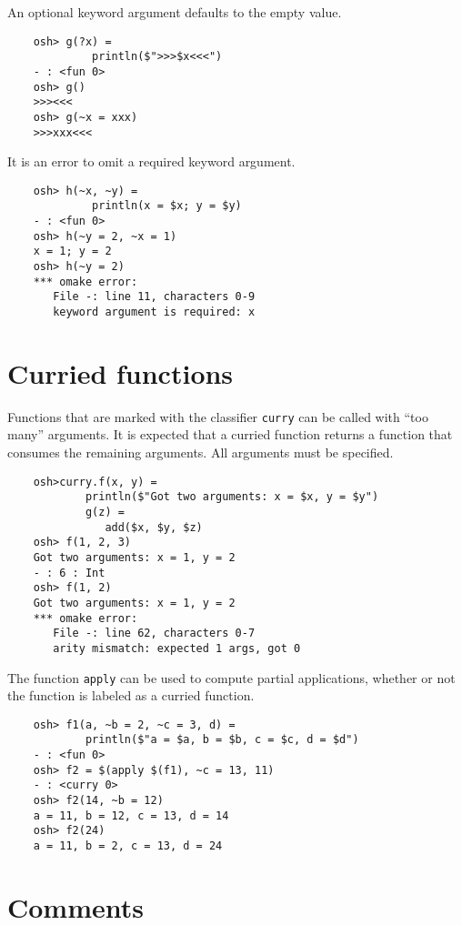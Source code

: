 An optional keyword argument defaults to the empty value.

\begin{verbatim}
    osh> g(?x) =
             println($">>>$x<<<")
    - : <fun 0>
    osh> g()
    >>><<<
    osh> g(~x = xxx)
    >>>xxx<<<
\end{verbatim}

It is an error to omit a required keyword argument.

\begin{verbatim}
    osh> h(~x, ~y) =
             println(x = $x; y = $y)
    - : <fun 0>
    osh> h(~y = 2, ~x = 1)
    x = 1; y = 2
    osh> h(~y = 2)
    *** omake error:
       File -: line 11, characters 0-9
       keyword argument is required: x
\end{verbatim}

\section{Curried functions}

Functions that are marked with the classifier \verb+curry+ can be called with ``too many'' arguments.
It is expected that a curried function returns a function that consumes the remaining arguments.
All arguments must be specified.

\begin{verbatim}
    osh>curry.f(x, y) =
            println($"Got two arguments: x = $x, y = $y")
            g(z) =
               add($x, $y, $z)
    osh> f(1, 2, 3)
    Got two arguments: x = 1, y = 2
    - : 6 : Int
    osh> f(1, 2)
    Got two arguments: x = 1, y = 2
    *** omake error:
       File -: line 62, characters 0-7
       arity mismatch: expected 1 args, got 0
\end{verbatim}

The function \verb+apply+ can be used to compute partial applications, whether or not the function
is labeled as a curried function.

\begin{verbatim}
    osh> f1(a, ~b = 2, ~c = 3, d) =
            println($"a = $a, b = $b, c = $c, d = $d")
    - : <fun 0>
    osh> f2 = $(apply $(f1), ~c = 13, 11)
    - : <curry 0>
    osh> f2(14, ~b = 12)
    a = 11, b = 12, c = 13, d = 14
    osh> f2(24)
    a = 11, b = 2, c = 13, d = 24
\end{verbatim}

\section{Comments}

